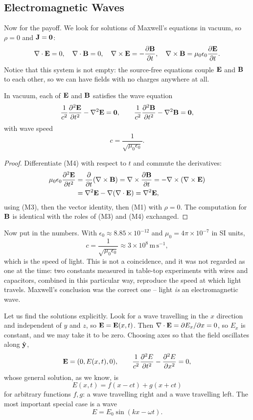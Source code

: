 \documentclass[a4paper]{scrartcl}
\newcommand{\hh}[1]{\hat{\vv{#1}}}
\begin{document}
\subsection{Electromagnetic Waves}

Now for the payoff. We look for solutions of Maxwell's equations in vacuum, so $\rho = 0$ and $\mathbf{J} = \mathbf{0}$:
$$
\nabla\cdot\mathbf{E} = 0,\quad \nabla\cdot\mathbf{B} = 0,\quad \nabla\times\mathbf{E} = -\frac{\partial \mathbf{B}}{\partial t},\quad \nabla\times\mathbf{B} = \mu_0\epsilon_0 \frac{\partial \mathbf{E}}{\partial t}.
$$
Notice that this system is not empty: the source-free equations couple $\mathbf{E}$ and $\mathbf{B}$ to each other, so we can have fields with no charges anywhere at all.

\begin{theorem}
	In vacuum, each of $\mathbf{E}$ and $\mathbf{B}$ satisfies the wave equation
	$$
	\frac{1}{c^2}\frac{\partial^2 \mathbf{E}}{\partial t^2} - \nabla^2 \mathbf{E} = \mathbf{0}, \qquad \frac{1}{c^2}\frac{\partial^2 \mathbf{B}}{\partial t^2} - \nabla^2 \mathbf{B} = \mathbf{0},
	$$
	with wave speed
	$$
	c = \frac{1}{\sqrt{\mu_0 \epsilon_0}}.
	$$
\end{theorem}
\begin{proof}
	Differentiate (M4) with respect to $t$ and commute the derivatives:
	\begin{align*}
		\mu_0\epsilon_0\frac{\partial^2 \mathbf{E}}{\partial t^2} &= \frac{\partial}{\partial t}(\nabla\times\mathbf{B}) = \nabla\times \frac{\partial \mathbf{B}}{\partial t} = -\nabla\times(\nabla\times \mathbf{E})\\
		&= \nabla^2 \mathbf{E} - \nabla(\nabla\cdot\mathbf{E}) = \nabla^2 \mathbf{E},
	\end{align*}
	using (M3), then the vector identity, then (M1) with $\rho = 0$. The computation for $\mathbf{B}$ is identical with the roles of (M3) and (M4) exchanged.
\end{proof}

Now put in the numbers. With $\epsilon_0 \approx 8.85\times 10^{-12}$ and $\mu_0 = 4\pi\times 10^{-7}$ in SI units,
$$
c = \frac{1}{\sqrt{\mu_0\epsilon_0}} \approx 3\times 10^8\,\mathrm{m}\,\mathrm{s}^{-1},
$$
which is the speed of light. This is not a coincidence, and it was not regarded as one at the time: two constants measured in table-top experiments with wires and capacitors, combined in this particular way, reproduce the speed at which light travels. Maxwell's conclusion was the correct one -- light \emph{is} an electromagnetic wave.

Let us find the solutions explicitly. Look for a wave travelling in the $x$ direction and independent of $y$ and $z$, so $\mathbf{E} = \mathbf{E}(x,t)$. Then $\nabla\cdot\mathbf{E} = \partial E_x/\partial x = 0$, so $E_x$ is constant, and we may take it to be zero. Choosing axes so that the field oscillates along $\hh{y}$,
$$
\mathbf{E} = (0, E(x,t), 0), \qquad \frac{1}{c^2}\frac{\partial^2 E}{\partial t^2} - \frac{\partial^2 E}{\partial x^2} = 0,
$$
whose general solution, as we know, is
$$
E(x,t) = f(x - ct) + g(x+ct)
$$
for arbitrary functions $f, g$: a wave travelling right and a wave travelling left. The most important special case is a  wave
$$
E = E_0 \sin(kx - \omega t).
$$
\end{document}
